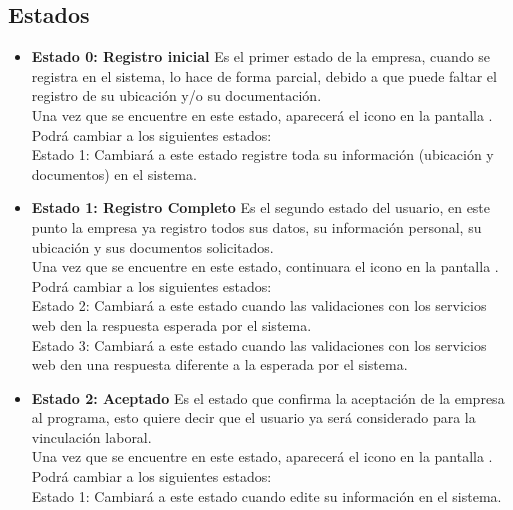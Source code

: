 \subsection{Estados}
	\begin{itemize} 
        \item \textbf{Estado 0: Registro inicial}
        Es el primer estado de la empresa, cuando se registra en el sistema, lo hace de forma parcial, debido a que puede faltar el registro de su ubicación y/o su documentación.\\
        
        Una vez que se encuentre en este estado, aparecerá el icono \faExclamationCircle en la pantalla .\\
         Podrá cambiar a los siguientes estados:\\
        Estado 1: Cambiará a este estado registre toda su información (ubicación y documentos) en el sistema.
         
        \item \textbf{Estado 1: Registro Completo} 
         Es el segundo estado del usuario, en este punto la empresa ya registro todos sus datos, su información personal, su ubicación y sus documentos solicitados. \\
          Una vez que se encuentre en este estado, continuara el icono \faExclamationCircle en la pantalla .
           Podrá cambiar a los siguientes estados:\\
        Estado 2: Cambiará a este estado cuando las validaciones con los servicios web den la respuesta esperada por el sistema.\\
        Estado 3: Cambiará a este estado cuando las validaciones con los servicios web den una respuesta diferente a la esperada por el sistema.
        
        \item \textbf{Estado 2: Aceptado} 
        Es el estado que confirma la aceptación de la empresa al programa, esto quiere decir que el usuario ya será considerado para la vinculación laboral.\\
        Una vez que se encuentre en este estado, aparecerá el icono \faCheckCircle en la pantalla .\\
        Podrá cambiar a los siguientes estados:\\
        Estado 1: Cambiará a este estado cuando edite su información en el sistema.
       

\end{itemize}
